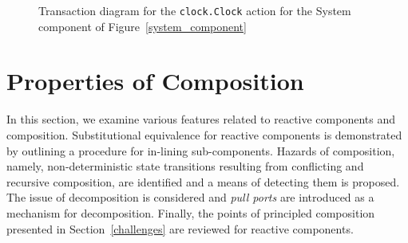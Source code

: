 \begin{figure}
\centering
\cprotect\caption{Transaction diagram for the \verb+clock.Clock+ action for the System component of Figure~\ref{system_component}}
\label{clock_transaction}
\end{figure}

\section{Properties of Composition}
\label{propcomp}
In this section, we examine various features related to reactive components and composition.
Substitutional equivalence for reactive components is demonstrated by outlining a procedure for in-lining sub-components.
Hazards of composition, namely, non-deterministic state transitions resulting from conflicting and recursive composition, are identified and a means of detecting them is proposed.
The issue of decomposition is considered and \emph{pull ports} are introduced as a mechanism for decomposition.
Finally, the points of principled composition presented in Section~\ref{challenges} are reviewed for reactive components.

